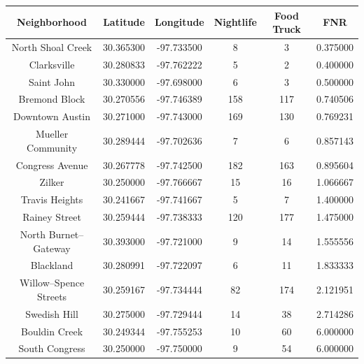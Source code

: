 \documentclass{deagle}
\begin{document}
\begin{center}
\begin{tabular}{|c|c|c|c|c|c|} \hline
    \textbf{Neighborhood} & \textbf{Latitude} & \textbf{Longitude} & \textbf{Nightlife} & \textbf{Food Truck} & \textbf{FNR} \\ \hline
    North Shoal Creek     & 30.365300 & -97.733500 & 8          & 3          &  0.375000 \\ \hline
    Clarksville           & 30.280833 & -97.762222 & 5          & 2          &  0.400000 \\ \hline
    Saint John            & 30.330000 & -97.698000 & 6          & 3          &  0.500000 \\ \hline
    Bremond Block         & 30.270556 & -97.746389 & 158        & 117        &  0.740506 \\ \hline
    Downtown Austin       & 30.271000 & -97.743000 & 169        & 130        &  0.769231 \\ \hline
    Mueller Community     & 30.289444 & -97.702636 & 7          & 6          &  0.857143 \\ \hline
    Congress Avenue       & 30.267778 & -97.742500 & 182        & 163        &  0.895604 \\ \hline
    Zilker                & 30.250000 & -97.766667 & 15         & 16         &  1.066667 \\ \hline
    Travis Heights        & 30.241667 & -97.741667 & 5          & 7          &  1.400000 \\ \hline
    Rainey Street         & 30.259444 & -97.738333 & 120        & 177        &  1.475000 \\ \hline
    North Burnet–Gateway  & 30.393000 & -97.721000 & 9          & 14         &  1.555556 \\ \hline
    Blackland             & 30.280991 & -97.722097 & 6          & 11         &  1.833333 \\ \hline
    Willow–Spence Streets & 30.259167 & -97.734444 & 82         & 174        &  2.121951 \\ \hline
    Swedish Hill          & 30.275000 & -97.729444 & 14         & 38         &  2.714286 \\ \hline
    Bouldin Creek         & 30.249344 & -97.755253 & 10         & 60         & 6.000000 \\ \hline
    South Congress        & 30.250000 & -97.750000 & 9          & 54         &  6.000000 \\ \hline
\end{tabular}
\end{center}
\end{document}
